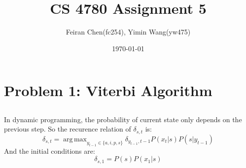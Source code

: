 \documentclass[letterpaper,11pt]{article}
\title{CS 4780 Assignment 5}
\author{Feiran Chen(fc254), Yimin Wang(yw475)}
\date{\today}
\DeclareMathOperator*{\argmax}{arg\,max}
\begin{document}
\maketitle
\section{Problem 1: Viterbi Algorithm}
\subsection{}
In dynamic programming, the probability of current state only depends on the
previous step.
So the recurence relation of $\delta_{s,t}$ is:
\[\delta_{s,t}=\argmax_{y_{t-1} \in \{a,i,p,s\}}\delta_{y_{t-1},t-1}P(x_t|s)P(s|y_{t-1})\]
And the initial conditions are:
\[\delta_{s,1}=P(s)P(x_1|s)\]
\subsection{}
\end{document}
